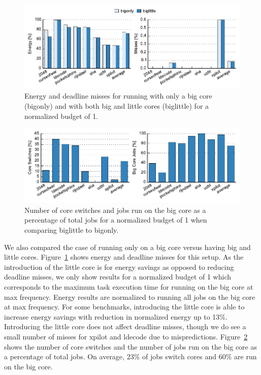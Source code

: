 \begin{figure}
  \begin{center}
    \includegraphics{exec_time_prediction/data/hetero_big_100_em.pdf}
    \caption{Energy and deadline misses for running with only a big core
    (bigonly) and with both big and little cores (biglittle) for a normalized
    budget of 1.}
    \label{fig:exec_time_prediction.evaluation.hetero_big_em}
  \end{center}
\end{figure}

\begin{figure}
  \begin{center}
    \includegraphics{exec_time_prediction/data/hetero_big_counts.pdf}
    \caption{Number of core switches and jobs run on the big core as a
    percentage of total jobs for a normalized budget of 1 when comparing
    biglittle to bigonly.}
    \label{fig:exec_time_prediction.evaluation.hetero_big_counts}
  \end{center}
\end{figure}

We also compared the case of running only on a big core versus having big and
little cores. Figure~\ref{fig:exec_time_prediction.evaluation.hetero_big_em} shows
energy and deadline misses for this setup. As the introduction of the little
core is for energy savings as opposed to reducing deadline misses, we only show
results for a normalized budget of 1 which corresponds to the maximum task
execution time for running on the big core at max frequency. Energy results
are normalized to running all jobs on the big core at max frequency. For some
benchmarks, introducing the little core is able to increase energy savings with
reduction in normalized energy up to 13\%. Introducing the little core does not
affect deadline misses, though we do see a small number of misses for xpilot
and ldecode due to mispredictions.
Figure~\ref{fig:exec_time_prediction.evaluation.hetero_big_counts} shows the
number of core switches and the number of jobs run on the big core as a
percentage of total jobs. On average, 23\% of jobs switch cores and 60\% are
run on the big core.

